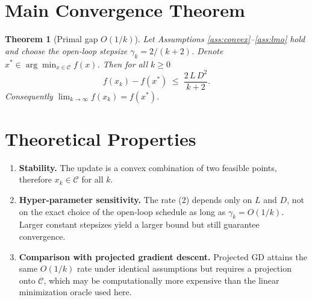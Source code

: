 \documentclass{article}
\newtheorem{theorem}{Theorem}
\begin{document}
\section*{Main Convergence Theorem}
\begin{theorem}[Primal gap $O(1/k)$]\label{thm:rate}
Let Assumptions \ref{ass:convex}–\ref{ass:lmo} hold and
choose the open‑loop stepsize $\gamma_{k}=2/(k+2)$.  Denote
$x^{*}\in\arg\min_{x\in\mathcal C}f(x)$.  Then for all $k\ge 0$
\[
f(x_{k})-f(x^{*})\;\le\;\frac{2\,L\,D^{2}}{k+2}.
\tag{2}
\]
Consequently $\displaystyle\lim_{k\to\infty}f(x_{k})=f(x^{*})$.
\end{theorem}

\section*{Theoretical Properties}
\begin{enumerate}[label=\arabic*.]
\item \textbf{Stability.} The update is a convex combination of two feasible
points, therefore $x_{k}\in\mathcal C$ for all $k$.
\item \textbf{Hyper‑parameter sensitivity.}
The rate (2) depends only on $L$ and $D$, not on the exact choice of the
open‑loop schedule as long as $\gamma_{k}=O(1/k)$.  Larger constant stepsizes
yield a larger bound but still guarantee convergence.
\item \textbf{Comparison with projected gradient descent.}
Projected GD attains the same $O(1/k)$ rate under identical assumptions but
requires a projection onto $\mathcal C$, which may be computationally more
expensive than the linear minimization oracle used here.
\end{enumerate}
\end{document}
